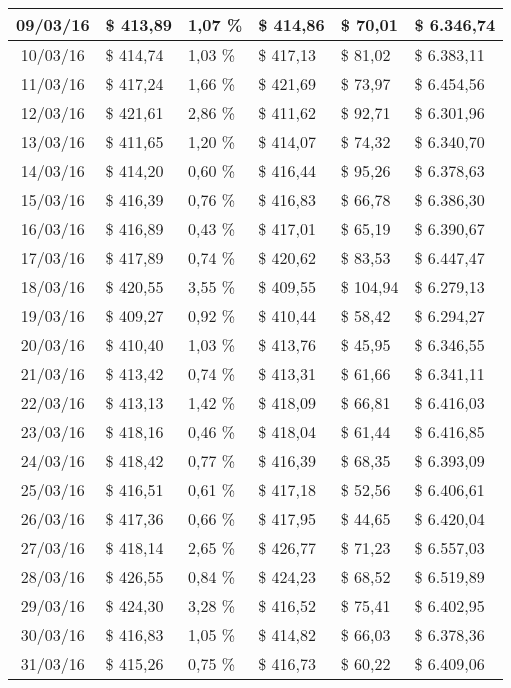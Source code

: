 \begin{small}
\begin{longtable}{|c|l|l|l|l|l|}
09/03/16 & \$ 413,89 & 1,07 \% & \$ 414,86 & \$ 70,01 & \$ 6.346,74 \\ \hline
10/03/16 & \$ 414,74 & 1,03 \% & \$ 417,13 & \$ 81,02 & \$ 6.383,11 \\ \hline
11/03/16 & \$ 417,24 & 1,66 \% & \$ 421,69 & \$ 73,97 & \$ 6.454,56 \\ \hline
12/03/16 & \$ 421,61 & 2,86 \% & \$ 411,62 & \$ 92,71 & \$ 6.301,96 \\ \hline
13/03/16 & \$ 411,65 & 1,20 \% & \$ 414,07 & \$ 74,32 & \$ 6.340,70 \\ \hline
14/03/16 & \$ 414,20 & 0,60 \% & \$ 416,44 & \$ 95,26 & \$ 6.378,63 \\ \hline
15/03/16 & \$ 416,39 & 0,76 \% & \$ 416,83 & \$ 66,78 & \$ 6.386,30 \\ \hline
16/03/16 & \$ 416,89 & 0,43 \% & \$ 417,01 & \$ 65,19 & \$ 6.390,67 \\ \hline
17/03/16 & \$ 417,89 & 0,74 \% & \$ 420,62 & \$ 83,53 & \$ 6.447,47 \\ \hline
18/03/16 & \$ 420,55 & 3,55 \% & \$ 409,55 & \$ 104,94 & \$ 6.279,13 \\ \hline
19/03/16 & \$ 409,27 & 0,92 \% & \$ 410,44 & \$ 58,42 & \$ 6.294,27 \\ \hline
20/03/16 & \$ 410,40 & 1,03 \% & \$ 413,76 & \$ 45,95 & \$ 6.346,55 \\ \hline
21/03/16 & \$ 413,42 & 0,74 \% & \$ 413,31 & \$ 61,66 & \$ 6.341,11 \\ \hline
22/03/16 & \$ 413,13 & 1,42 \% & \$ 418,09 & \$ 66,81 & \$ 6.416,03 \\ \hline
23/03/16 & \$ 418,16 & 0,46 \% & \$ 418,04 & \$ 61,44 & \$ 6.416,85 \\ \hline
24/03/16 & \$ 418,42 & 0,77 \% & \$ 416,39 & \$ 68,35 & \$ 6.393,09 \\ \hline
25/03/16 & \$ 416,51 & 0,61 \% & \$ 417,18 & \$ 52,56 & \$ 6.406,61 \\ \hline
26/03/16 & \$ 417,36 & 0,66 \% & \$ 417,95 & \$ 44,65 & \$ 6.420,04 \\ \hline
27/03/16 & \$ 418,14 & 2,65 \% & \$ 426,77 & \$ 71,23 & \$ 6.557,03 \\ \hline
28/03/16 & \$ 426,55 & 0,84 \% & \$ 424,23 & \$ 68,52 & \$ 6.519,89 \\ \hline
29/03/16 & \$ 424,30 & 3,28 \% & \$ 416,52 & \$ 75,41 & \$ 6.402,95 \\ \hline
30/03/16 & \$ 416,83 & 1,05 \% & \$ 414,82 & \$ 66,03 & \$ 6.378,36 \\ \hline
31/03/16 & \$ 415,26 & 0,75 \% & \$ 416,73 & \$ 60,22 & \$ 6.409,06 \\ \hline

\end{longtable}
\end{small}
